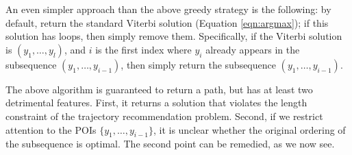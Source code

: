 
An even simpler approach than the above greedy strategy is the following:
by default, return the standard Viterbi solution (Equation \ref{eqn:argmax});
if this solution has loops, then simply remove them.
Specifically, if the Viterbi solution is $( y_1, \ldots, y_l )$,
and $i$ is the first index where $y_i$ already appears in the subsequence $( y_1, \ldots, y_{i-1} )$,
then simply return the subsequence $( y_1, \ldots, y_{i-1} )$.

The above algorithm is guaranteed to return a path,
but has at least two detrimental features.
First, it returns a solution that violates the length constraint of the trajectory recommendation problem.
Second, if we restrict attention to the POIs $\{ y_1, \ldots, y_{i-1} \}$, it is unclear whether the original ordering of the subsequence is optimal.
The second point can be remedied, as we now see.
